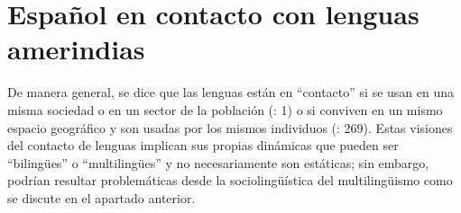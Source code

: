 \documentclass[output=paper]{langscibook}
\begin{document}
\section{Español en contacto con lenguas amerindias} 

De manera general, se dice que las lenguas están en “contacto” si se usan en una misma sociedad o en un sector de la población (\citealt{KleeLynch2009indigenas}: 1) o si conviven en un mismo espacio geográfico y son usadas por los mismos individuos (\citealt{Silva-CorvalánEnrique-Arias2001}: 269). Estas visiones del contacto de lenguas implican sus propias dinámicas que pueden ser “bilingües” o “multilingües” y no necesariamente son estáticas; sin embargo, podrían resultar problemáticas desde la sociolingüística del multilingüismo como se discute en el apartado anterior.
\end{document}
